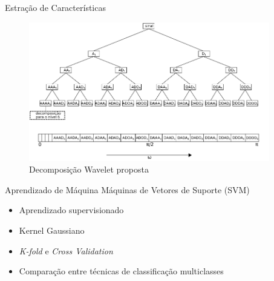 \documentclass[10pt]{beamer}
\begin{document}

\begin{frame}{Estração de Características}
  \begin{figure}[]
    \centering
    \includegraphics[width=10.5cm]{images/waveletProposal.png}
    \caption{Decomposição Wavelet proposta}
  \end{figure}
\end{frame}

\begin{frame}{Aprendizado de Máquina}
    Máquinas de Vetores de Suporte (SVM)
    \begin{itemize}
      \item Aprendizado supervisionado
      \item Kernel Gaussiano
      \item \textit{K-fold} e \textit{Cross Validation}
      \item Comparação entre técnicas de classificação multiclasses
    \end{itemize}


\end{frame}
\end{document}
